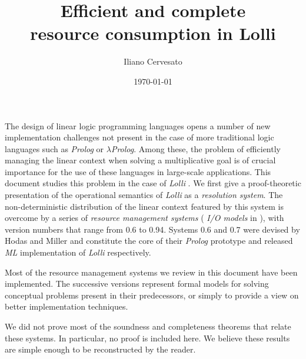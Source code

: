 \renewcommand{\topfraction}{1.0}
\renewcommand{\textfraction}{0.0}
\renewcommand{\floatpagefraction}{0.0}

\title{\bf Efficient and complete\\
           resource consumption in Lolli}
\author{Iliano Cervesato}
\date{\today}


\renewcommand{\thepage}{}

\maketitle

The design of linear logic programming languages opens a number of new
implementation challenges not present in the case of more traditional logic
languages such as {\em Prolog\/} or {\em $\lambda$Prolog}. Among these, the
problem of efficiently managing the linear context when solving a
multiplicative goal is of crucial importance for the use of these languages
in large-scale applications. This document studies this problem in the case
of {\em Lolli\/} \cite{HoM94}. We first give a proof-theoretic presentation
of the operational semantics of {\em Lolli\/} as a {\em resolution system}.
The non-deterministic distribution of the linear context featured by this
system is overcome by a series of {\em resource management systems\/} ({\em
  I/O models\/} in \cite{HoM94}), with version numbers that range from 0.6 to
0.94. Systems 0.6 and 0.7 were devised by Hodas and Miller \cite{HoM94} and
constitute the core of their {\em Prolog\/} prototype and released {\em ML\/}
implementation of {\em Lolli\/} respectively.

Most of the resource management systems we review in this document have been
implemented.  The successive versions represent formal models for solving
conceptual problems present in their predecessors, or simply to provide a
view on better implementation techniques.

We did not prove most of the soundness and completeness theorems that relate
these systems. In particular, no proof is included here. We believe these
results are simple enough to be reconstructed by the reader.


\newpage
\setcounter{page}{1}
\renewcommand{\thepage}{\em \roman{page}}

